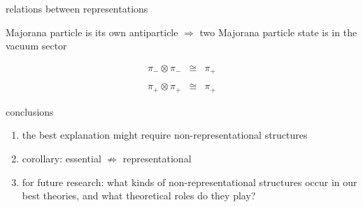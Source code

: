 \documentclass{beamer}
\begin{document}
\begin{frame}{relations between representations}

Majorana particle is its own antiparticle \newline
$\Longrightarrow$ two Majorana particle state is in the vacuum sector

\bigskip
\[ \begin{array}{lll}
\pi _{-}\otimes \pi _{-} & \cong & \pi _{+}  \\ \\
\pi _{+}\otimes \pi _{+} & \cong & \pi _{+} \end{array} \]


\end{frame}

\begin{frame}{conclusions}

\begin{enumerate}
\item the best explanation might require non-representational
  structures
\item corollary: essential $\not\Longrightarrow$ representational
\item for future research: what kinds of non-representational
  structures occur in our best theories, and what theoretical roles do
  they play?
\end{enumerate}

\end{frame}
\end{document}
